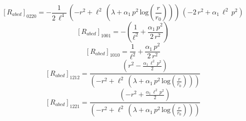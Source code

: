 \documentclass[11pt]{article}
\begin{document}
\begin{dmath*}[breakdepth={5}]
\left[R_{abcd}\right]_{0220} = -\frac{1}{2\,{\ell}^{4}}\,\left(-{r}^{2} + {\ell}^{2}\,\left(\lambda + \alpha_{1}\,{p}^{2}\,\mathrm{log}\!\left(\frac{r}{r_{0}}\right)\right)\right)\,\left(-2\,{r}^{2} + \alpha_{1}\,{\ell}^{2}\,{p}^{2}\right)
\end{dmath*}
\begin{dmath*}[breakdepth={5}]
\left[R_{abcd}\right]_{1001} = -\left(\frac{1}{{\ell}^{2}} + \frac{\alpha_{1}\,{p}^{2}}{2\,{r}^{2}}\right)
\end{dmath*}
\begin{dmath*}[breakdepth={5}]
\left[R_{abcd}\right]_{1010} = \frac{1}{{\ell}^{2}} + \frac{\alpha_{1}\,{p}^{2}}{2\,{r}^{2}}
\end{dmath*}
\begin{dmath*}[breakdepth={5}]
\left[R_{abcd}\right]_{1212} = \frac{\left({r}^{2} - \frac{\alpha_{1}\,{\ell}^{2}\,{p}^{2}}{2}\right)}{\left(-{r}^{2} + {\ell}^{2}\,\left(\lambda + \alpha_{1}\,{p}^{2}\,\mathrm{log}\!\left(\frac{r}{r_{0}}\right)\right)\right)}
\end{dmath*}
\begin{dmath*}[breakdepth={5}]
\left[R_{abcd}\right]_{1221} = \frac{\left(-{r}^{2} + \frac{\alpha_{1}\,{\ell}^{2}\,{p}^{2}}{2}\right)}{\left(-{r}^{2} + {\ell}^{2}\,\left(\lambda + \alpha_{1}\,{p}^{2}\,\mathrm{log}\!\left(\frac{r}{r_{0}}\right)\right)\right)}
\end{dmath*}
\end{document}
